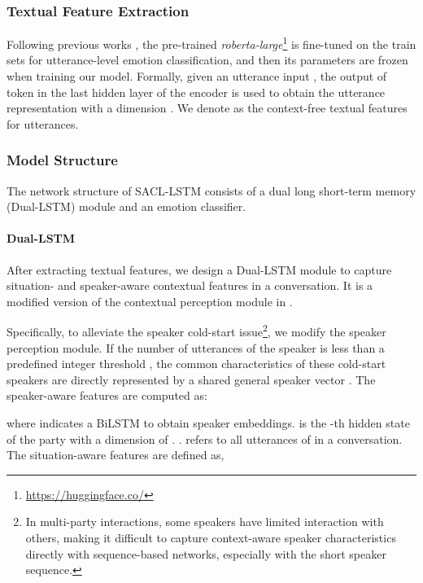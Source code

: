 \documentclass[11pt]{article}
\begin{document}
\subsubsection{Textual Feature Extraction}
Following previous works \cite{DBLP:conf/emnlp/GhosalMGMP20,DBLP:conf/acl/ShenWYQ20}, the pre-trained 
\textit{roberta-large}\footnote{\url{https://huggingface.co/}\label{huggingface}}
\cite{DBLP:journals/corr/abs-1907-11692} is fine-tuned on the train sets for utterance-level emotion classification, and then its parameters are frozen when training our model. 
Formally, given an utterance input , the output of  token in the last hidden layer of the encoder is used to obtain the utterance representation  with a dimension .
We denote  as the context-free textual features for  utterances.


\subsubsection{Model Structure} \label{sec:modelst}

The network structure of SACL-LSTM consists of a dual long short-term memory (Dual-LSTM) module and an emotion classifier.

\paragraph{Dual-LSTM}
After extracting textual features, we design a Dual-LSTM module to capture situation- and speaker-aware contextual features in a conversation. It is a modified version of the contextual perception module in \citet{DBLP:conf/acl/HuWH20}.
 
Specifically, to alleviate the speaker cold-start issue\footnote{In multi-party interactions, some speakers have limited interaction with others, making it difficult to capture context-aware speaker characteristics directly with sequence-based networks, especially with the short speaker sequence.},
we modify the speaker perception module. 
If the number of utterances of the speaker is less than a predefined integer threshold , the common characteristics of these cold-start speakers are directly represented by a shared general speaker vector .
The speaker-aware features  are computed as:
 
where  indicates a BiLSTM to obtain speaker embeddings. 
 is the -th hidden state of the party  with a dimension of . . 
 refers to all utterances of  in a conversation. 
The situation-aware features  are defined as,
\end{document}
